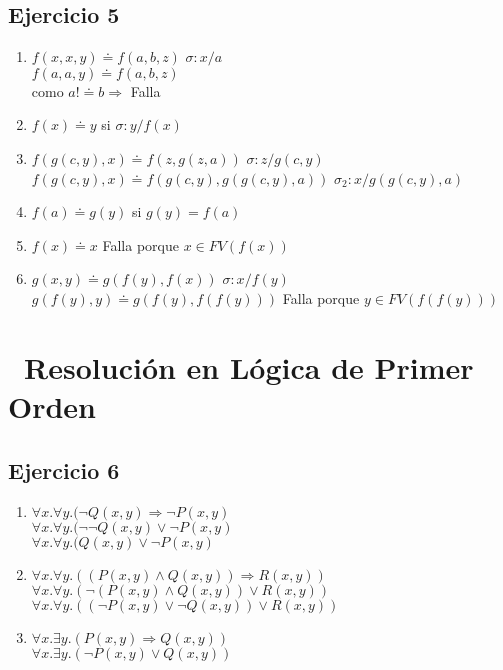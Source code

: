 \documentclass[10pt,a4paper]{article}
\begin{document}
\subsection{Ejercicio 5 }
\begin{enumerate}
    \item $f(x,x,y) \doteq f(a,b,z)$ $\sigma:{x/a}$ \\
    $f(a,a,y) \doteq f(a,b,z)$ \\
    como $a ! \doteq b \Rightarrow$ Falla 
    \item $f(x) \doteq y$ si $\sigma:{y/f(x)}$
    \item $f(g(c,y),x) \doteq f(z,g(z,a))$ $\sigma:{z/g(c,y)}$
    $f(g(c,y),x) \doteq f(g(c,y),g(g(c,y),a))$ $\sigma_{2}:{x/g(g(c,y),a)}$
    \item $f(a) \doteq g(y)$ si $g(y)=f(a)$
    \item $f(x) \doteq x$ Falla porque $x \in FV(f(x))$
    \item $g(x,y) \doteq g(f(y),f(x))$ $\sigma:{x/f(y)}$
    $g(f(y),y) \doteq g(f(y),f(f(y)))$ Falla porque $y \in FV(f(f(y)))$
\end{enumerate}

\section*{\ Resolución en Lógica de Primer Orden}
\subsection{Ejercicio 6}
    \begin{enumerate}
        \item $\forall x.  \forall y. ( \neg Q(x,y) \Rightarrow \neg P(x,y)$ \\
        $\forall x.  \forall y. ( \neg \neg Q(x,y) \vee \neg P(x,y)$ \\
        $\forall x.  \forall y. ( Q(x,y) \vee \neg P(x,y)$
        \item $\forall x.  \forall y. ((P(x,y) \wedge Q(x,y)) \Rightarrow R(x,y))$ \\
        $\forall x.  \forall y. (\neg (P(x,y) \wedge Q(x,y)) \vee R(x,y))$ \\
        $\forall x.  \forall y. ((\neg P(x,y) \vee \neg Q(x,y)) \vee R(x,y))$
        \item $\forall x.  \exists y. (P(x,y) \Rightarrow Q(x,y))$ \\
        $\forall x.  \exists y. (\neg P(x,y) \vee Q(x,y))$
    \end{enumerate}
\end{document}
